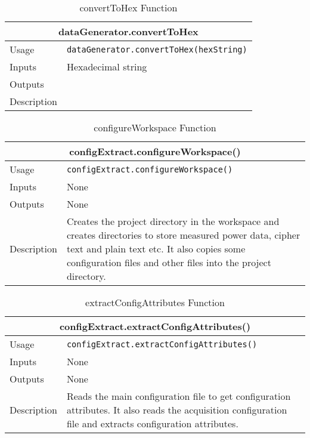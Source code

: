 \begin{table}
\caption{convertToHex Function}
\begin{tabular}{ |p{2cm}||p{11cm}|  }
 \hline
 \multicolumn{2}{|c|}{\textbf{dataGenerator.convertToHex}} \\
 \hline
 Usage & \texttt{dataGenerator.convertToHex(hexString)}\\ \hline
 Inputs & Hexadecimal string  \\ \hline
 Outputs &  \\ \hline
 Description &  \\ \hline
\end{tabular}
\end{table}
\begin{table}
\caption{configureWorkspace Function}
\begin{tabular}{ |p{2cm}||p{11cm}|  }
 \hline
 \multicolumn{2}{|c|}{\textbf{configExtract.configureWorkspace()}} \\
 \hline
 Usage & \texttt{configExtract.configureWorkspace()}\\ \hline
 Inputs & None \\ \hline
 Outputs &  None \\ \hline
 Description & Creates the project directory in the workspace and creates directories to store measured power data, cipher text and plain text etc.
 It also copies some configuration files and other files into the project directory. \\ \hline
\end{tabular}
\end{table}

\begin{table}
\caption{extractConfigAttributes Function}
\begin{tabular}{ |p{2cm}||p{11cm}|  }
 \hline
 \multicolumn{2}{|c|}{\textbf{configExtract.extractConfigAttributes()}} \\
 \hline
 Usage & \texttt{configExtract.extractConfigAttributes()}\\ \hline
 Inputs & None \\ \hline
 Outputs &  None \\ \hline
 Description & Reads the main configuration file to get configuration attributes. It also reads the acquisition configuration file and extracts configuration attributes. \\ \hline
\end{tabular}
\end{table}

